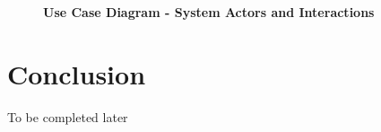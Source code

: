\documentclass[12pt,a4paper]{article}
\begin{document}
\begin{figure}[H]
    \centering
    \caption{\textbf{Use Case Diagram - System Actors and Interactions}}
    \label{fig:usecase}
\end{figure}

\newpage

\section*{Conclusion}

To be completed later
\end{document}
